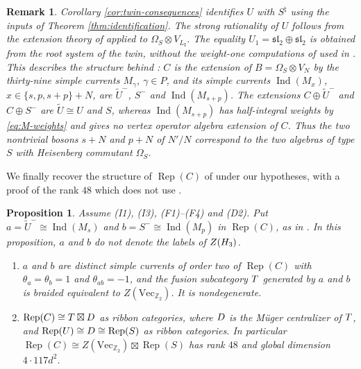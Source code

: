 \documentclass[leqno]{article}
\let\cal\relax
\newcommand{\cal}{\mathcal}
\newcommand{\Z}{\ensuremath{\mathbb{Z}}}
\newcommand{\ot}{\otimes}
\DeclareMathOperator{\Rep}{Rep}
\DeclareMathOperator{\Ind}{Ind}
\newtheorem{prop}[thm]{Proposition}
\newtheorem{remark}[thm]{Remark}
\numberwithin{equation}{section}
\begin{document}
\begin{remark}\normalfont
\label{rem:twin-comparison}
Corollary \ref{cor:twin-consequences} identifies $U$ with $S^\natural$ using the inputs of Theorem \ref{thm:identification}. The strong rationality of $U$ follows from the extension theory of \cite{HKL15,CKM22} applied to $\Omega_S \ot V_{L_{\mathrm I}}$. The equality $U_1 = \mathfrak{sl}_2 \oplus \mathfrak{sl}_2$ is obtained from the root system of the twin, without the weight-one computations of \cite{Hua26} used in \cite[Proposition 9.4]{DJX26}. This describes the structure behind \cite[Theorem 7.3]{DJX26}: $C$ is the extension of $B = \Omega_S \ot V_N$ by the thirty-nine simple currents $M_\gamma$, $\gamma \in P$, and its simple currents $\Ind(M_x)$, $x \in \{s,p,s+p\}+N$, are $\tilde U^-$, $S^-$ and $\Ind(M_{s+p})$. The extensions $C \oplus \tilde U^-$ and $C \oplus S^-$ are $\tilde U \cong U$ and $S$, whereas $\Ind(M_{s+p})$ has half-integral weights by \eqref{eq:M-weights} and gives no vertex operator algebra extension of $C$. Thus the two nontrivial bosons $s+N$ and $p+N$ of $N'/N$ correspond to the two algebras of type $S$ with Heisenberg commutant $\Omega_S$.
\end{remark}

We finally recover the structure of $\Rep(C)$ of \cite[Section 9]{DJX26} under our hypotheses, with a proof of the rank $48$ which does not use \cite[Theorem 3.1]{DJX26}.

\begin{prop}
\label{prop:Rep-C}
Assume \textup{(I1)}, \textup{(I3)}, \textup{(F1)}--\textup{(F4)} and \textup{(D2)}. Put $a = \tilde U^- \cong \Ind(M_s)$ and $b = S^- \cong \Ind(M_p)$ in $\Rep(C)$, as in \cite[(9.1)]{DJX26}. In this proposition, $a$ and $b$ do not denote the labels of $Z(\cal H_3)$.
\begin{enumerate}
\item $a$ and $b$ are distinct simple currents of order two of $\Rep(C)$ with $\theta_a = \theta_b = 1$ and $\theta_{ab} = -1$, and the fusion subcategory $\cal T$ generated by $a$ and $b$ is braided equivalent to $Z(\mathrm{Vec}_{\Z_2})$. It is nondegenerate.
\item $\Rep(C) \cong \cal T \boxtimes \cal D$ as ribbon categories, where $\cal D$ is the Müger centralizer of $\cal T$, and $\Rep(U) \cong \cal D \cong \Rep(S)$ as ribbon categories. In particular $\Rep(C) \cong Z(\mathrm{Vec}_{\Z_2}) \boxtimes \Rep(S)$ has rank $48$ and global dimension $4 \cdot 117d^2$.
\end{enumerate}
\end{prop}
\end{document}
